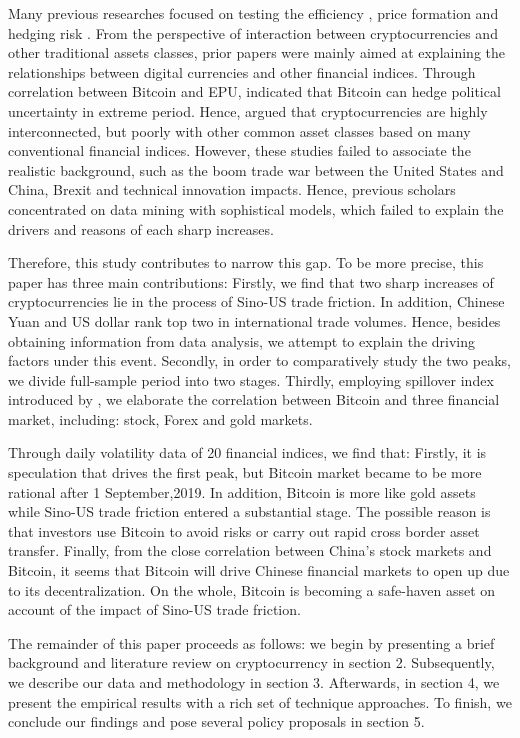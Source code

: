 \documentclass[review]{elsarticle}
\begin{document}
Many previous researches focused on testing the efficiency \cite{Ji2018}, price formation \cite{dyhrberg2018investible} and hedging risk \cite{Corbet2018}. From the perspective of interaction between cryptocurrencies and other traditional assets classes, prior papers were mainly aimed at explaining the relationships between digital currencies and other financial indices. Through correlation between Bitcoin and EPU, \cite{demir2018does} indicated that Bitcoin can hedge political uncertainty in extreme period. Hence, \cite{Baur2018} argued that cryptocurrencies are highly interconnected, but poorly with other common asset classes based on many conventional financial indices. However, these studies failed to associate the realistic background, such as the boom trade war between the United States and China, Brexit and  technical innovation impacts. Hence, previous scholars concentrated on data mining with sophistical models, which failed to explain the drivers and reasons of each sharp increases.


Therefore, this study contributes to narrow this gap. To be more precise, this paper has three main contributions: Firstly, we find that two sharp increases of cryptocurrencies lie in the process of Sino-US trade friction. In addition, Chinese Yuan and US dollar rank top two in international trade volumes. Hence, besides obtaining information from data analysis, we attempt to explain the driving factors under this event. Secondly, in order to comparatively study the two peaks, we divide full-sample period into two stages. Thirdly, employing spillover index introduced by \cite{Diebold2012}, we elaborate the correlation between Bitcoin and three financial market, including: stock, Forex and gold markets. 


Through daily volatility data of 20 financial indices, we find that: Firstly, it is speculation that drives the first peak, but Bitcoin market became to be more rational after 1 September,2019. In addition, Bitcoin is more like gold assets while Sino-US trade friction entered a substantial stage. The possible reason is that investors use Bitcoin to avoid risks or carry out rapid cross border asset transfer. Finally, from the close correlation between China's stock markets and Bitcoin, it seems that Bitcoin will drive Chinese financial markets to open up due to its decentralization. On the whole, Bitcoin is becoming a safe-haven asset on account of the impact of Sino-US trade friction.


The remainder of this paper proceeds as follows: we begin by presenting a brief background and literature review on cryptocurrency in section 2. Subsequently, we describe our data and methodology in section 3. Afterwards, in section 4, we present the empirical results with a rich set of technique approaches. To finish, we conclude our findings and pose several policy proposals in section 5.
\end{document}
